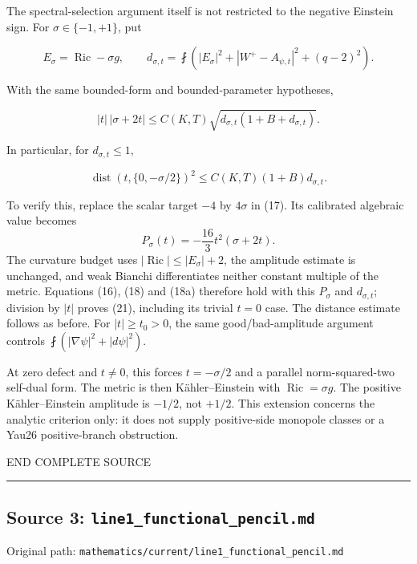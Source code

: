 \documentclass[
  10pt,
]{article}
\begin{document}
The spectral-selection argument itself is not restricted to the negative
Einstein sign. For \(\sigma\in\{-1,+1\}\), put

\[
E_\sigma=\operatorname{Ric}-\sigma g,\qquad
d_{\sigma,t}=\fint\left(
|E_\sigma|^2+|W^+-A_{\psi,t}|^2+(q-2)^2\right).
\]

With the same bounded-form and bounded-parameter hypotheses,

\[
\boxed{\quad
|t|\,|\sigma+2t|
\le C(K,T)\sqrt{d_{\sigma,t}(1+B+d_{\sigma,t})}.
\quad}                                                     \tag{21}
\]

In particular, for \(d_{\sigma,t}\le1\),

\[
\operatorname{dist}(t,\{0,-\sigma/2\})^2
\le C(K,T)(1+B)d_{\sigma,t}.                               \tag{22}
\]

To verify this, replace the scalar target \(-4\) by \(4\sigma\) in (17).
Its calibrated algebraic value becomes \[
P_\sigma(t)=-\frac{16}{3}t^2(\sigma+2t).
\] The curvature budget uses \(|\operatorname{Ric}|\le|E_\sigma|+2\),
the amplitude estimate is unchanged, and weak Bianchi differentiates
neither constant multiple of the metric. Equations (16), (18) and (18a)
therefore hold with this \(P_\sigma\) and \(d_{\sigma,t}\); division by
\(|t|\) proves (21), including its trivial \(t=0\) case. The distance
estimate follows as before. For \(|t|\ge t_0>0\), the same
good/bad-amplitude argument controls
\(\fint(|\nabla\psi|^2+|d\psi|^2)\).

At zero defect and \(t\ne0\), this forces \(t=-\sigma/2\) and a parallel
norm-squared-two self-dual form. The metric is then Kähler--Einstein
with \(\operatorname{Ric}=\sigma g\). The positive Kähler--Einstein
amplitude is \(-1/2\), not \(+1/2\). This extension concerns the
analytic criterion only: it does not supply positive-side monopole
classes or a Yau26 positive-branch obstruction.

END COMPLETE SOURCE

\begin{center}\rule{0.5\linewidth}{0.5pt}\end{center}

\hypertarget{source-3-line1_functional_pencil.md}{%
\subsection{Source 3:
\nolinkurl{line1_functional_pencil.md}}\label{source-3-line1_functional_pencil.md}}

Original path: \nolinkurl{mathematics/current/line1_functional_pencil.md}
\end{document}
